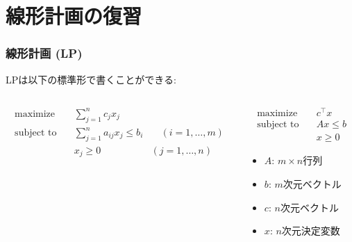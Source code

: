 \documentclass[14pt,aspectratio=169,xcolor=dvipsnames,table,onlytextwidth,dvipdfmx]{beamer}
\begin{document}
\section{線形計画の復習}
\begin{frame}
    \frametitle{線形計画 (LP)}

    LPは以下の標準形で書くことができる:
    \begin{columns}[T]
    \begin{column}{.55\textwidth}
    \begin{block}{}
        \small
        \setlength{\abovedisplayskip}{0pt}
        \begin{alignat*}{2}
            \text{maximize} & \quad  \sum_{j = 1}^n c_j x_j & \\
            \text{subject to} & \quad \sum_{j = 1}^n a_{ij} x_j \leq b_i & \quad (i = 1, \dots, m) \\
            & \quad x_j \geq 0 \quad & (j = 1, \dots, n)
        \end{alignat*}
    \end{block}
    \end{column}
    \begin{column}{.4\textwidth}
        \pause
    \begin{block}{}
        \setlength{\abovedisplayskip}{0pt}
        \begin{alignat*}{2}
            \text{maximize} & \quad  c^\top x \\
            \text{subject to} & \quad A x \leq b  \\
            & \quad x \geq 0 
        \end{alignat*}
    \end{block}
        \footnotesize
        \begin{itemize}
            \item $A$: $m \times n$行列
            \item $b$: $m$次元ベクトル
            \item $c$: $n$次元ベクトル
            \item $x$: $n$次元決定変数
        \end{itemize}
    \end{column}
    \end{columns}
\end{frame}
\end{document}
